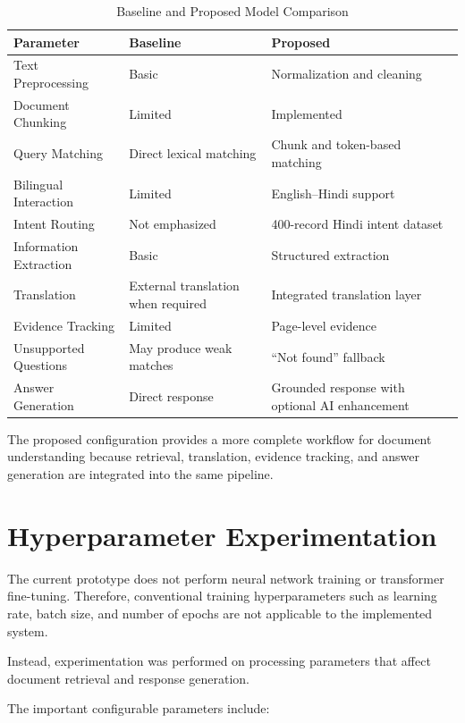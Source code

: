 \begin{table}[H]
\centering
\caption{Baseline and Proposed Model Comparison}
\begin{tabular}{|p{5cm}|p{3.5cm}|p{3.5cm}|}
\hline
\textbf{Parameter} & \textbf{Baseline} & \textbf{Proposed} \\
\hline
Text Preprocessing & Basic & Normalization and cleaning \\
\hline
Document Chunking & Limited & Implemented \\
\hline
Query Matching & Direct lexical matching & Chunk and token-based matching \\
\hline
Bilingual Interaction & Limited & English--Hindi support \\
\hline
Intent Routing & Not emphasized & 400-record Hindi intent dataset \\
\hline
Information Extraction & Basic & Structured extraction \\
\hline
Translation & External translation when required & Integrated translation layer \\
\hline
Evidence Tracking & Limited & Page-level evidence \\
\hline
Unsupported Questions & May produce weak matches & ``Not found'' fallback \\
\hline
Answer Generation & Direct response & Grounded response with optional AI enhancement \\
\hline
\end{tabular}
\end{table}

The proposed configuration provides a more complete workflow for
document understanding because retrieval, translation, evidence
tracking, and answer generation are integrated into the same pipeline.

\section{Hyperparameter Experimentation}

The current prototype does not perform neural network training or
transformer fine-tuning. Therefore, conventional training
hyperparameters such as learning rate, batch size, and number of
epochs are not applicable to the implemented system.

Instead, experimentation was performed on processing parameters that
affect document retrieval and response generation.

The important configurable parameters include:

